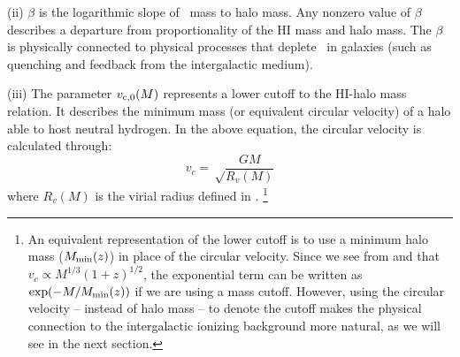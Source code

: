 (ii) $\beta$ is the logarithmic slope of \HI\ mass to halo mass. Any nonzero value of $\beta$ describes a  departure from proportionality of the HI mass and halo mass. The $\beta$ is physically connected to physical processes that deplete \HI\ in galaxies (such as quenching and feedback from the intergalactic medium).

(iii) The parameter $v_{\rm c, 0} (M)$  represents a lower cutoff to the HI-halo mass relation. It describes the minimum mass (or equivalent circular velocity) of a halo able to host neutral hydrogen. In the above equation, the circular velocity is calculated through:
\begin{equation}
    v_{c} = \sqrt\frac{GM}{R_v(M)}
    \label{vcRv}
\end{equation}
where $R_v(M)$ is the virial radius defined in . 
\footnote{An equivalent representation of the lower cutoff is to use a minimum halo mass ($M_{\rm min} (z)$) in place of the circular velocity. Since we see from  and  that $v_c \propto M^{1/3}(1+z)^{1/2}$, the exponential term  can be written as  $\exp(-M/M_{\rm min} (z))$ if we are using a mass cutoff. However, using the circular velocity -- instead of halo mass  -- to denote the cutoff makes the physical connection to the intergalactic ionizing background more natural, as we will see in the next section.}

